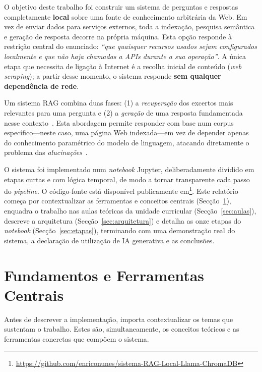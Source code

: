 \documentclass[]{ceurart}
\begin{document}
O objetivo deste trabalho foi construir um sistema de perguntas e respostas
completamente \textbf{local} sobre uma fonte de conhecimento arbitrária da Web.
Em vez de enviar dados para serviços externos, toda a indexação, pesquisa
semântica e geração de resposta decorre na própria máquina. Esta opção responde
à restrição central do enunciado: \emph{``que quaisquer recursos usados sejam
configurados localmente e que não haja chamadas a APIs durante a sua operação''}.
A única etapa que necessita de ligação à Internet é a recolha inicial de
conteúdo (\emph{web scraping}); a partir desse momento, o sistema responde
\textbf{sem qualquer dependência de rede}.

Um sistema RAG combina duas fases: (1) a \emph{recuperação} dos excertos mais
relevantes para uma pergunta e (2) a \emph{geração} de uma resposta fundamentada
nesse contexto~\cite{gao2024rag}. Esta abordagem permite responder com base num
corpus específico---neste caso, uma página Web indexada---em vez de depender
apenas do conhecimento paramétrico do modelo de linguagem, atacando diretamente
o problema das \emph{alucinações}~\cite{ji2023hallucination}.

O sistema foi implementado num \emph{notebook} Jupyter, deliberadamente dividido
em etapas curtas e com lógica temporal, de modo a tornar transparente cada passo
do \emph{pipeline}. O código-fonte está disponível publicamente
em\footnote{\url{https://github.com/enriconunes/sistema-RAG-Local-Llama-ChromaDB}}.
Este relatório começa por contextualizar as ferramentas e conceitos centrais
(Secção~\ref{sec:fundamentos}), enquadra o trabalho nas aulas teóricas da unidade
curricular (Secção~\ref{sec:aulas}), descreve a arquitetura
(Secção~\ref{sec:arquitetura}) e detalha as onze etapas do
\emph{notebook} (Secção~\ref{sec:etapas}), terminando com uma demonstração real
do sistema, a declaração de utilização de IA generativa e as conclusões.

\section{Fundamentos e Ferramentas Centrais}
\label{sec:fundamentos}

Antes de descrever a implementação, importa contextualizar os temas que sustentam
o trabalho. Estes são, simultaneamente, os conceitos teóricos e as ferramentas
concretas que compõem o sistema.
\end{document}
